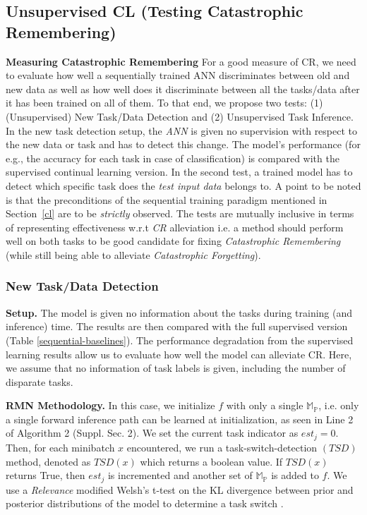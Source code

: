 \documentclass{article}
\begin{document}
\subsection{Unsupervised CL (Testing Catastrophic Remembering)}\label{cr-ex}

\textbf{Measuring Catastrophic Remembering}
For a good measure of CR, we need to evaluate how well a sequentially trained ANN discriminates between old and new data as well as how well does it discriminate between all the tasks/data after it has been trained on all of them.
To that end, we propose two tests: (1) (Unsupervised) New Task/Data Detection and (2) Unsupervised Task Inference.
In the new task detection setup, the \textit{ANN} is given no supervision with respect to the new data or task and has to detect this change. The model's performance (for e.g., the accuracy for each task in case of classification) is compared with the supervised continual learning version. In the second test, a trained model has to detect which specific task does the \textit{test input data} belongs to. A point to be noted is that the preconditions of the sequential training paradigm mentioned in Section~\ref{cl} are to be \textit{strictly} observed. The tests are mutually inclusive in terms of representing effectiveness w.r.t \textit{CR} alleviation i.e. a method should perform well on both tasks to be good candidate for fixing \textit{Catastrophic Remembering} (while still being able to alleviate \textit{Catastrophic Forgetting}).

\subsubsection{New Task/Data Detection}

\textbf{Setup.} The model is given no information about the tasks during training (and inference) time. The results are then compared with the full supervised version (Table \ref{sequential-baselines}). The performance degradation from the supervised learning results allow us to evaluate how well the model can alleviate CR. Here, we assume that no information of task labels is given, including the number of disparate tasks. 

\textbf{RMN Methodology.} In this case, we initialize $f$ with only a single $\mathbb{M_P}$, i.e. only a single forward inference path can be learned
at initialization, as seen in Line 2 of Algorithm 2 (Suppl. Sec. 2). We set the current task indicator as $est_j {=} 0$. Then, for each minibatch $x$ encountered, we run a task-switch-detection $(TSD)$ method, denoted as $TSD(x)$ which returns a boolean value. If $TSD(x)$ returns True, then $est_j$ is incremented and another set of $\mathbb{M_P}$ is added to $f$. 
We use a \textit{Relevance} modified Welsh’s t-test on the KL divergence between prior and posterior distributions of the model to determine a task switch \cite{titsias2019functional, hendrycks2016baseline, lee2018simple}.
\end{document}
